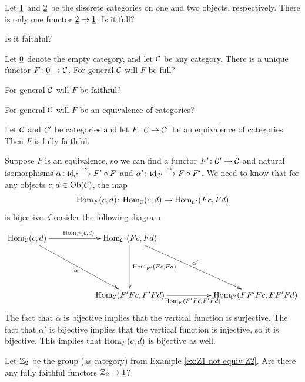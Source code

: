 \documentclass[CT4S-EN-RU]{subfiles}
\begin{document}
\begin{definitionRUS}\label{def:full faithful}
\end{definitionRUS}

\begin{exerciseENG}
Let $\underline{1}$ and $\underline{2}$ be the discrete categories on one and two objects, respectively. There is only one functor $\underline{2}\rightarrow\underline{1}$.
\sexc Is it full?
\item Is it faithful?
\endsexc
\end{exerciseENG}

\begin{exerciseRUS}
\end{exerciseRUS}

\begin{exerciseENG}\label{exc:empty fully faithful}
Let $\underline{0}$ denote the empty category, and let $\mathcal{C}$ be any category. There is a unique functor $F\colon \underline{0}\rightarrow\mathcal{C}$.
\sexc For general $\mathcal{C}$ will $F$ be full?
\item For general $\mathcal{C}$ will $F$ be faithful?
\item For general $\mathcal{C}$ will $F$ be an equivalence of categories?
\endsexc
\end{exerciseENG}

\begin{exerciseRUS}\label{exc:empty fully faithful}
\end{exerciseRUS}

\begin{propositionENG}
Let $\mathcal{C}$ and $\mathcal{C}'$ be categories and let $F\colon\mathcal{C}\rightarrow\mathcal{C}'$ be an equivalence of categories. Then $F$ is fully faithful.
\end{propositionENG}

\begin{propositionRUS}
\end{propositionRUS}

\begin{proofENG}
Suppose $F$ is an equivalence, so we can find a functor $F'\colon\mathcal{C}'\rightarrow\mathcal{C}$ and natural isomorphisms $\alpha\colon\textnormal{id}_\mathcal{C}\xrightarrow{\cong}F'\circ F$ and $\alpha'\colon\textnormal{id}_{\mathcal{C}'}\xrightarrow{\cong} F\circ F'$. We need to know that for any objects $c,d\in\textnormal{Ob}(\mathcal{C})$, the map $$\textnormal{Hom}_F(c,d)\colon\textnormal{Hom}_\mathcal{C}(c,d)\rightarrow\textnormal{Hom}_{\mathcal{C}'}(Fc,Fd)$$ is bijective. Consider the following diagram 
$$
\xymatrix{
\Hom_\mcC(c,d)\ar[rr]^{\Hom_F(c,d)}\ar[ddrr]_\alpha&&\Hom_{\mcC'}(Fc,Fd)\ar[ddrr]^{\alpha'}\ar[dd]^{\Hom_{F'}(Fc,Fd)}\\\\
&&\Hom_\mcC(F'Fc,F'Fd)\ar[rr]_{\Hom_{F}(F'Fc,F'Fd)}&&\Hom_{\mcC'}(FF'Fc,FF'Fd)
}
$$
The fact that $\alpha$ is bijective implies that the vertical function is surjective. The fact that $\alpha'$ is bijective implies that the vertical function is injective, so it is bijective. This implies that $\textnormal{Hom}_F(c,d)$ is bijective as well.
\end{proofENG}

\begin{proofRUS}
\end{proofRUS}

\begin{exerciseENG}
Let ${\mathbb Z}_2$ be the group (as category) from Example \ref{ex:Z1 not equiv Z2}. Are there any fully faithful functors ${\mathbb Z}_2\rightarrow\underline{1}$?
\end{exerciseENG}

\begin{exerciseRUS}
\end{exerciseRUS}
\end{document}
